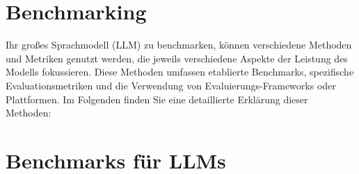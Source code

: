\section{Benchmarking}
\label{sec:benchmarking}
  Ihr großes Sprachmodell (LLM) zu benchmarken, können verschiedene Methoden und Metriken genutzt werden, die jeweils verschiedene Aspekte der Leistung des Modells fokussieren. Diese Methoden umfassen etablierte Benchmarks, spezifische Evaluationsmetriken und die Verwendung von Evaluierungs-Frameworks oder Plattformen. Im Folgenden finden Sie eine detaillierte Erklärung dieser Methoden: 
 
 \section{Benchmarks für LLMs} 
 
